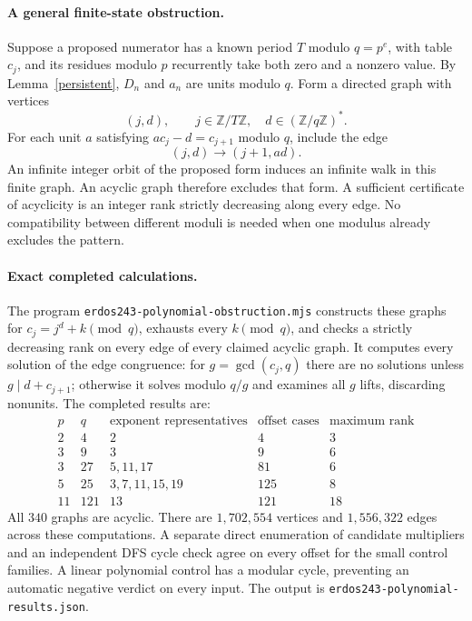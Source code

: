 \documentclass[11pt]{article}
\begin{document}
\paragraph{A general finite-state obstruction.}
Suppose a proposed numerator has a known period $T$ modulo $q=p^e$,
with table $c_j$, and its residues modulo $p$ recurrently take both zero
and a nonzero value. By Lemma~\ref{persistent}, $D_n$ and $a_n$ are units
modulo $q$. Form a directed graph with vertices
\[
 (j,d),\qquad j\in\mathbb Z/T\mathbb Z,\quad d\in(\mathbb Z/q\mathbb Z)^*.
\]
For each unit $a$ satisfying $ac_j-d=c_{j+1}$ modulo $q$, include the edge
\[
 (j,d)\longrightarrow(j+1,ad).
\]
An infinite integer orbit of the proposed form induces an infinite walk
in this finite graph. An acyclic graph therefore excludes that form.
A sufficient certificate of acyclicity is an integer rank strictly
decreasing along every edge. No compatibility between different moduli
is needed when one modulus already excludes the pattern.

\paragraph{Exact completed calculations.}
The program \texttt{erdos243-polynomial-obstruction.mjs} constructs these
graphs for $c_j=j^d+k\pmod q$, exhausts every $k\pmod q$, and checks a
strictly decreasing rank on every edge of every claimed acyclic graph.
It computes every solution of the edge congruence: for
$g=\gcd(c_j,q)$ there are no solutions unless $g\mid d+c_{j+1}$;
otherwise it solves modulo $q/g$ and examines all $g$ lifts, discarding
nonunits. The completed results are:
\[
\begin{array}{c|c|c|r|r}
 p&q&\text{exponent representatives}&\text{offset cases}&\text{maximum rank}\\\hline
 2&4&2&4&3\\
 3&9&3&9&6\\
 3&27&5,11,17&81&6\\
 5&25&3,7,11,15,19&125&8\\
 11&121&13&121&18
\end{array}
\]
All $340$ graphs are acyclic. There are $1,702,554$ vertices and
$1,556,322$ edges across these computations. A separate direct enumeration
of candidate multipliers and an independent DFS cycle check agree on
every offset for the small control families. A linear polynomial control
has a modular cycle, preventing an automatic negative verdict on every
input. The output is \texttt{erdos243-polynomial-results.json}.
\end{document}
